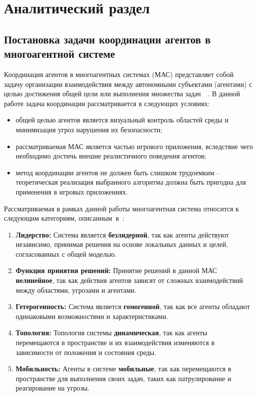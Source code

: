\chapter{Аналитический раздел}

\section{Постановка задачи координации агентов в многоагентной системе}

Координация агентов в многоагентных системах (МАС) представляет собой задачу организации взаимодействия между автономными субъектами (агентами) с целью достижения общей цели или выполнения множества задач~\cite{wooldridge2009introduction}~\cite{coordination-book}.
В данной работе задача координации рассматривается в следующих условиях:
\begin{itemize}
	\item общей целью агентов является визуальный контроль областей среды и минимизация угроз нарушения их безопасности;
	\item рассматриваемая МАС является частью игрового приложения, вследствие чего необходимо достичь внешне реалистичного поведения агентов;
	\item метод координации агентов не должен быть слишком трудоемким -- теоретическая реализация выбранного алгоритма должна быть пригодна для применения в игровых приложениях.
\end{itemize}

Рассматриваемая в рамках данной работы многоагентная система относится к следующим категориям, описанным~в~\cite{ieee-mas}:
\begin{enumerate}
	\item \textbf{Лидерство:}  
	Система является \textbf{безлидерной}, так как агенты действуют независимо, принимая решения на основе локальных данных и целей, согласованных с общей моделью.
	
	\item \textbf{Функция принятия решений:}  
	Принятие решений в данной МАС \textbf{нелинейное}, так как действия агентов зависят от сложных взаимодействий между областями, угрозами и агентами.
	
	\item \textbf{Гетерогенность:}  
	Система является \textbf{гомогенной}, так как все агенты обладают одинаковыми возможностями и характеристиками.
	
	\item \textbf{Топология:}  
	Топология системы \textbf{динамическая}, так как агенты перемещаются в пространстве и их взаимодействия изменяются в зависимости от положения и состояния среды.
	
	\item \textbf{Мобильность:}  
	Агенты в системе \textbf{мобильные}, так как перемещаются в пространстве для выполнения своих задач, таких как патрулирование и реагирование на угрозы.
\end{enumerate}

